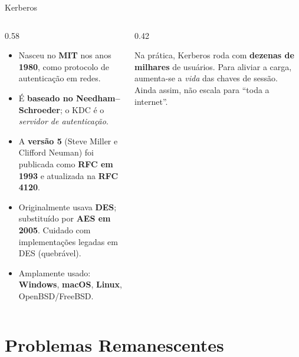 \documentclass{beamer}
\begin{document}
\begin{frame}{Kerberos}
    \begin{columns}[T]
        \begin{column}{0.58\textwidth}
            \begin{itemize}
                \footnotesize
                \item Nasceu no \textbf{MIT} nos anos \textbf{1980}, como protocolo de autenticação em redes.
                \item É \textbf{baseado no Needham--Schroeder}; o KDC é o \emph{servidor de autenticação}.
                \item A \textbf{versão 5} (Steve Miller e Clifford Neuman) foi publicada como \textbf{RFC em 1993} e atualizada na \textbf{RFC 4120}.
                \item Originalmente usava \textbf{DES}; substituído por \textbf{AES em 2005}. \alert{Cuidado} com implementações legadas em DES (quebrável).
                \item Amplamente usado: \textbf{Windows}, \textbf{macOS}, \textbf{Linux}, OpenBSD/FreeBSD.
            \end{itemize}
        \end{column}
        \begin{column}{0.42\textwidth}
            \begin{tcolorbox}[colback=blue!5,colframe=blue!50!black,boxrule=0.5pt,title=\footnotesize Escala]
                \footnotesize
                Na prática, Kerberos roda com \textbf{dezenas de milhares} de usuários. Para aliviar a carga, aumenta-se a \emph{vida} das chaves de sessão. Ainda assim, não escala para ``toda a internet''.
            \end{tcolorbox}
        \end{column}
    \end{columns}
\end{frame}

\section{Problemas Remanescentes}
\end{document}
